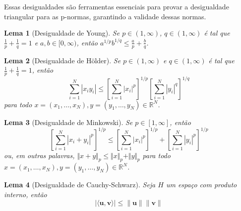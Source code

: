 \documentclass[11pt]{article}
\theoremstyle{yellowhead}
\newtheorem*{lemma}{Lema}
\theoremstyle{yellowdef}
\begin{document}
\begin{multicols}{3}
Essas desigualdades são ferramentas essenciais para provar a desigualdade triangular para as p-normas, garantindo a validade dessas normas.

\begin{lemma}[Desigualdade de Young]
Se $p \in (1, \infty)$, $q \in (1, \infty)$ é tal que $\frac{1}{p} + \frac{1}{q} = 1$ e $a, b \in [0, \infty)$, então $a^{1/p} b^{1/q} \le \frac{a}{p} + \frac{b}{q}$.
\end{lemma}

\begin{lemma}[Desigualdade de Hölder]
Se $p \in (1, \infty)$ e $q \in (1, \infty)$ é tal que $\frac{1}{p} + \frac{1}{q} = 1$, então
\[
\sum_{i=1}^{N} |x_i y_i| \le \left[ \sum_{i=1}^{N} |x_i|^p \right]^{1/p} \left[ \sum_{i=1}^{N} |y_i|^q \right]^{1/q}
\]
para todo $x = (x_1, \dots, x_N), y = (y_1, \dots, y_N) \in \mathbb{R}^N$.
\end{lemma}

\begin{lemma}[Desigualdade de Minkowski]
Se $p \in [1, \infty]$, então
\[
\left[ \sum_{i=1}^{N} |x_i + y_i|^p \right]^{1/p} \le \left[ \sum_{i=1}^{N} |x_i|^p \right]^{1/p} + \left[ \sum_{i=1}^{N} |y_i|^p \right]^{1/p}
\]
ou, em outras palavras, $\Vert x + y \Vert_p \le \Vert x \Vert_p + \Vert y \Vert_p$ para todo $x = (x_1, \dots, x_N), y = (y_1, \dots, y_N) \in \mathbb{R}^N$.
\end{lemma}
\begin{lemma}[Desigualdade de Cauchy-Schwarz]
    Seja $H$ um espaço com produto interno, então $$|\langle \mathbf{u}, \mathbf{v} \rangle| \leq \| \mathbf{u} \| \| \mathbf{v} \|$$
\end{lemma}
\end{multicols}
\end{document}
